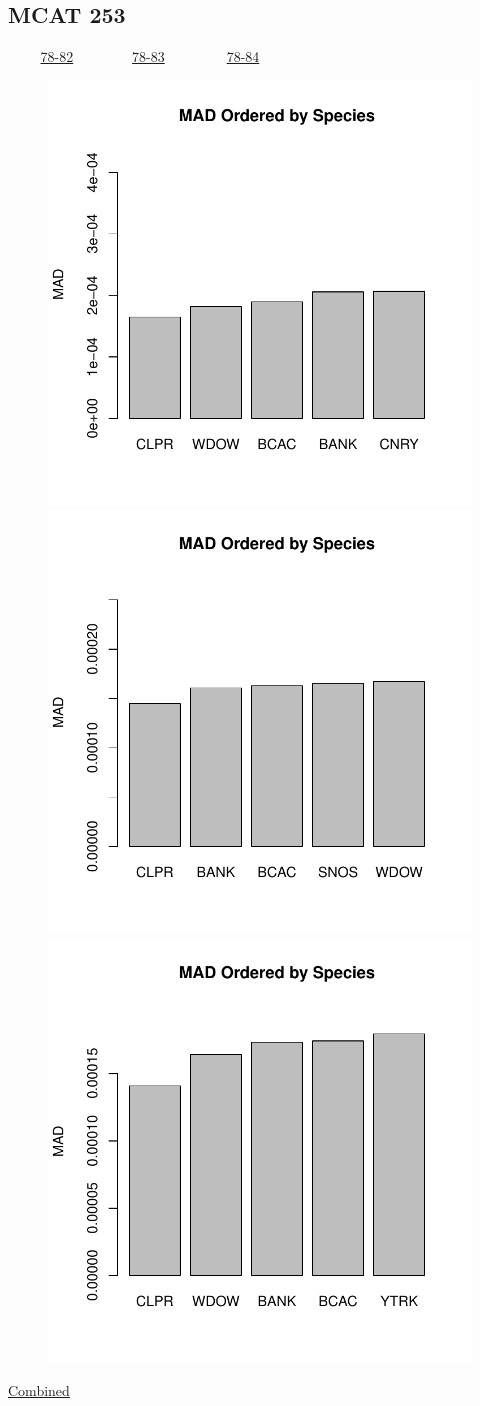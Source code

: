 \documentclass[ xcolor = pdftex, dvipsnames, table ]{beamer}
\begin{document}
\subsection{MCAT 253}
\begin{frame}{$~~~~~~~~~$ \href{https://github.com/gasduster99/sppComp/tree/master/sscRuns/25319781982M4}{78-82} $~~~~~~~~~~~~~~~~$ \href{https://github.com/gasduster99/sppComp/tree/master/sscRuns/25319781983M4}{78-83} $~~~~~~~~~~~~~~~~~$ \href{https://github.com/gasduster99/sppComp/tree/master/sscRuns/25319781984M4}{78-84} }
        \begin{figure}[ht!]
        \centering
        \hspace*{-1cm}
        \includegraphics[width=.4\textwidth]{../sscRuns/25319781982M4/sppHeadMad68.pdf}
        \includegraphics[width=.4\textwidth]{../sscRuns/25319781983M4/sppHeadMad68.pdf}
        \includegraphics[width=.4\textwidth]{../sscRuns/25319781984M4/sppHeadMad68.pdf}
        \end{figure}
	\vspace{-1cm}
	\begin{center}
	\Large
	\href{https://github.com/gasduster99/sppComp/tree/master/try1/postSSC/25319781982345M4}{Combined}
	\end{center}
\end{frame}
\end{document}
